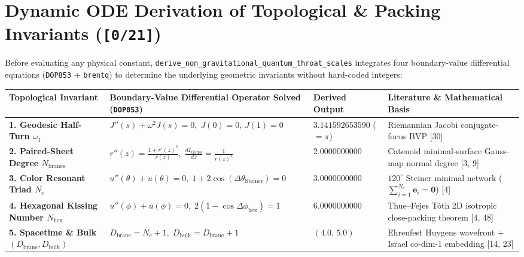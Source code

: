 \documentclass[10pt,a4paper]{article}
\begin{document}
\section{Dynamic ODE Derivation of Topological \& Packing Invariants (\texttt{[0/21]})}
Before evaluating any physical constant, \texttt{derive\_non\_gravitational\_quantum\_throat\_scales} integrates four boundary-value differential equations (\texttt{DOP853} + \texttt{brentq}) to determine the underlying geometric invariants without hard-coded integers:
\begin{center}\footnotesize
\begin{tabular}{p{}p{}p{}p{}}
\toprule
Topological Invariant & Boundary-Value Differential Operator Solved (\texttt{DOP853}) & Derived Output & Literature \& Mathematical Basis \\ \midrule
\textbf{1. Geodesic Half-Turn $\omega_1$} & $J''(s) + \omega^2 J(s) = 0, \; J(0)=0, \, J(1)=0$ & $3.141592653590$ ($=\pi$) & Riemannian Jacobi conjugate-focus BVP [30] \\
\textbf{2. Paired-Sheet Degree $N_{\text{branes}}$} & $r''(z) = \frac{1+r'(z)^2}{r(z)}, \; \frac{dI_{\text{Gauss}}}{dz} = \frac{1}{r(z)^2}$ & $2.0000000000$ & Catenoid minimal-surface Gauss-map normal degree [3, 9] \\
\textbf{3. Color Resonant Triad $N_c$} & $u''(\theta) + u(\theta) = 0, \; 1 + 2\cos(\Delta\theta_{\text{Steiner}}) = 0$ & $3.0000000000$ & $120^\circ$ Steiner minimal network ($\sum_{i=1}^{N_c}\mathbf{e}_i = \mathbf{0}$) [4] \\
\textbf{4. Hexagonal Kissing Number $N_{\text{hex}}$} & $u''(\phi) + u(\phi) = 0, \; 2(1 - \cos\Delta\phi_{\text{hex}}) = 1$ & $6.0000000000$ & Thue–Fejes Tóth 2D isotropic close-packing theorem [4, 48] \\
\textbf{5. Spacetime \& Bulk $(D_{\text{brane}}, D_{\text{bulk}})$} & $D_{\text{brane}} = N_c + 1, \; D_{\text{bulk}} = D_{\text{brane}} + 1$ & $(4.0, \, 5.0)$ & Ehrenfest Huygens wavefront + Israel co-dim-1 embedding [14, 23] \\
\bottomrule\end{tabular}\end{center}
\end{document}
